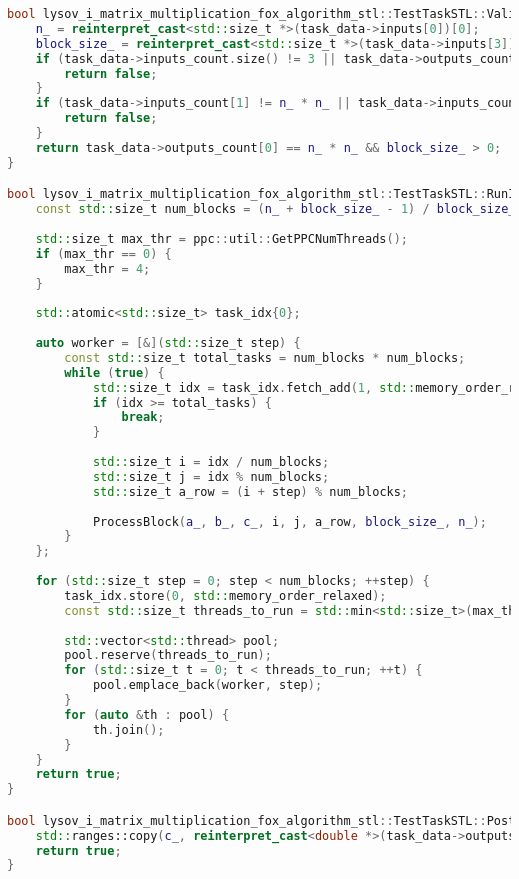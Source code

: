 \documentclass[12pt,a4paper]{extarticle}
\begin{document}
\begin{lstlisting}[language=C++]
bool lysov_i_matrix_multiplication_fox_algorithm_stl::TestTaskSTL::ValidationImpl() {
	n_ = reinterpret_cast<std::size_t *>(task_data->inputs[0])[0];
	block_size_ = reinterpret_cast<std::size_t *>(task_data->inputs[3])[0];
	if (task_data->inputs_count.size() != 3 || task_data->outputs_count.size() != 1) {
		return false;
	}
	if (task_data->inputs_count[1] != n_ * n_ || task_data->inputs_count[0] != n_ * n_) {
		return false;
	}
	return task_data->outputs_count[0] == n_ * n_ && block_size_ > 0;
}

bool lysov_i_matrix_multiplication_fox_algorithm_stl::TestTaskSTL::RunImpl() {
	const std::size_t num_blocks = (n_ + block_size_ - 1) / block_size_;
	
	std::size_t max_thr = ppc::util::GetPPCNumThreads();
	if (max_thr == 0) {
		max_thr = 4;
	}
	
	std::atomic<std::size_t> task_idx{0};
	
	auto worker = [&](std::size_t step) {
		const std::size_t total_tasks = num_blocks * num_blocks;
		while (true) {
			std::size_t idx = task_idx.fetch_add(1, std::memory_order_relaxed);
			if (idx >= total_tasks) {
				break;
			}
			
			std::size_t i = idx / num_blocks;
			std::size_t j = idx % num_blocks;
			std::size_t a_row = (i + step) % num_blocks;
			
			ProcessBlock(a_, b_, c_, i, j, a_row, block_size_, n_);
		}
	};
	
	for (std::size_t step = 0; step < num_blocks; ++step) {
		task_idx.store(0, std::memory_order_relaxed);
		const std::size_t threads_to_run = std::min<std::size_t>(max_thr, num_blocks * num_blocks);
		
		std::vector<std::thread> pool;
		pool.reserve(threads_to_run);
		for (std::size_t t = 0; t < threads_to_run; ++t) {
			pool.emplace_back(worker, step);
		}
		for (auto &th : pool) {
			th.join();
		}
	}
	return true;
}

bool lysov_i_matrix_multiplication_fox_algorithm_stl::TestTaskSTL::PostProcessingImpl() {
	std::ranges::copy(c_, reinterpret_cast<double *>(task_data->outputs[0]));
	return true;
}

\end{lstlisting}

\clearpage
{}
\end{document}
